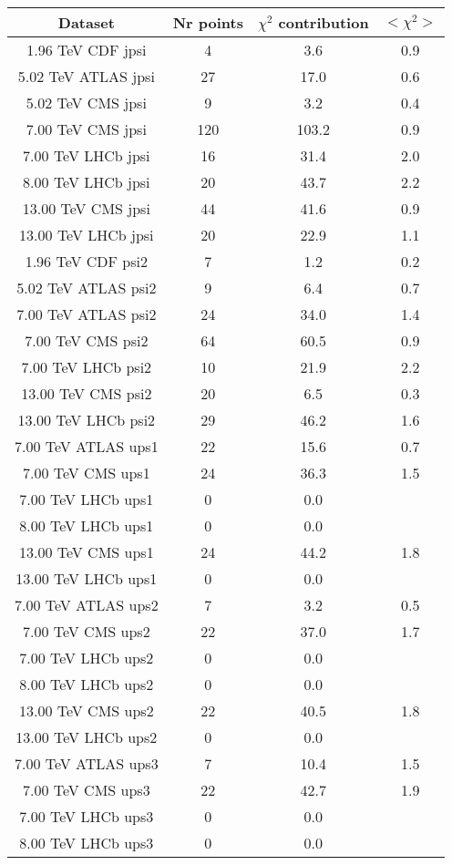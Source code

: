 \begin{table}[h!]
\centering
\begin{tabular}{c|c|c|c}
Dataset & Nr points & $\chi^2$ contribution & $<\chi^2>$ \\
\hline
1.96 TeV CDF jpsi & 4 & 3.6 & 0.9 \\
5.02 TeV ATLAS jpsi & 27 & 17.0 & 0.6 \\
5.02 TeV CMS jpsi & 9 & 3.2 & 0.4 \\
7.00 TeV CMS jpsi & 120 & 103.2 & 0.9 \\
7.00 TeV LHCb jpsi & 16 & 31.4 & 2.0 \\
8.00 TeV LHCb jpsi & 20 & 43.7 & 2.2 \\
13.00 TeV CMS jpsi & 44 & 41.6 & 0.9 \\
13.00 TeV LHCb jpsi & 20 & 22.9 & 1.1 \\
1.96 TeV CDF psi2 & 7 & 1.2 & 0.2 \\
5.02 TeV ATLAS psi2 & 9 & 6.4 & 0.7 \\
7.00 TeV ATLAS psi2 & 24 & 34.0 & 1.4 \\
7.00 TeV CMS psi2 & 64 & 60.5 & 0.9 \\
7.00 TeV LHCb psi2 & 10 & 21.9 & 2.2 \\
13.00 TeV CMS psi2 & 20 & 6.5 & 0.3 \\
13.00 TeV LHCb psi2 & 29 & 46.2 & 1.6 \\
7.00 TeV ATLAS ups1 & 22 & 15.6 & 0.7 \\
7.00 TeV CMS ups1 & 24 & 36.3 & 1.5 \\
7.00 TeV LHCb ups1 & 0 & 0.0 &  \\
8.00 TeV LHCb ups1 & 0 & 0.0 &  \\
13.00 TeV CMS ups1 & 24 & 44.2 & 1.8 \\
13.00 TeV LHCb ups1 & 0 & 0.0 &  \\
7.00 TeV ATLAS ups2 & 7 & 3.2 & 0.5 \\
7.00 TeV CMS ups2 & 22 & 37.0 & 1.7 \\
7.00 TeV LHCb ups2 & 0 & 0.0 &  \\
8.00 TeV LHCb ups2 & 0 & 0.0 &  \\
13.00 TeV CMS ups2 & 22 & 40.5 & 1.8 \\
13.00 TeV LHCb ups2 & 0 & 0.0 &  \\
7.00 TeV ATLAS ups3 & 7 & 10.4 & 1.5 \\
7.00 TeV CMS ups3 & 22 & 42.7 & 1.9 \\
7.00 TeV LHCb ups3 & 0 & 0.0 &  \\
8.00 TeV LHCb ups3 & 0 & 0.0 &  \\

\end{tabular}
\end{table}
